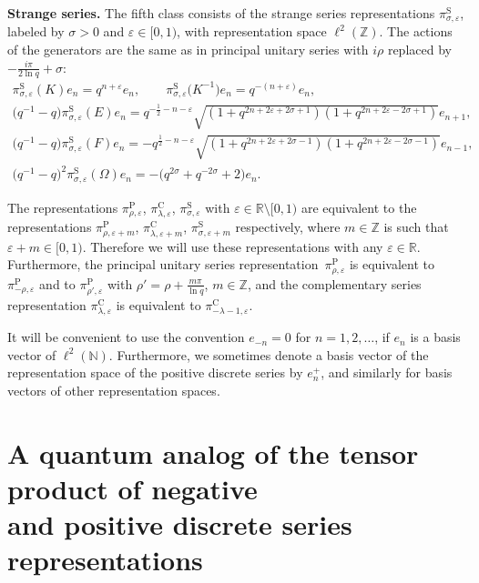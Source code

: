 \documentclass[11pt]{article}
\numberwithin{equation}{section}
\numberwithin{theorem}{section}
\numberwithin{proposition}{section}
\numberwithin{lemma}{section}
\numberwithin{corollary}{section}
\numberwithin{definition}{section}
\numberwithin{example}{section}
\numberwithin{remark}{section}
\numberwithin{note}{section}
\newcommand{\R}{\mathbb R}
\newcommand{\N}{\mathbb N}
\newcommand{\Z}{\mathbb Z}
\newcommand{\eps}{\varepsilon}
\begin{document}
\textbf{Strange series.} The f\/ifth class consists of the strange series representations $\pi^{\mathrm S}_{\sigma,\eps}$, labeled by $\sigma>0$ and $\eps \in [0,1)$, with representation space $\ell^2(\Z)$. The actions of the generators are the same as in principal unitary series with $i\rho$ replaced by $- \frac{ i\pi}{2\ln q}+\sigma$:
\begin{gather}
\pi^{\mathrm S}_{\sigma,\eps}(K) e_n = q^{n+\eps} e_n, \qquad
\pi^{\mathrm S}_{\sigma,\eps} \big(K^{-1}\big) e_n = q^{-(n+\eps)} e_n,\nonumber\\
\big(q^{-1}-q\big)\pi^{\mathrm S}_{\sigma,\eps}(E) e_n
= q^{-\frac12-n-\eps} \sqrt{(1+q^{2n+2\eps+2\sigma+1})
(1+q^{2n+2\eps-2\sigma+1})} e_{n+1},\nonumber\\
\big(q^{-1}-q\big)\pi^{\mathrm S}_{\sigma,\eps}(F) e_n = -q^{\frac12-n-\eps}
\sqrt{(1+q^{2n+2\eps+2\sigma-1}) (1+q^{2n+2\eps-2\sigma-1})} e_{n-1},\nonumber\\
\big(q^{-1}-q\big)^2 \pi^{\mathrm S}_{\sigma,\eps} (\Omega) e_n =-\big(q^{2\sigma}+q^{-2\sigma} +2\big)e_n.\label{eq:strange}
\end{gather}

The representations $\pi^{\mathrm P}_{\rho,\eps}$, $\pi^{\mathrm C}_{\lambda,\eps}$, $\pi^{\mathrm S}_{\sigma,\eps}$ with $\eps \in \R\setminus [0,1)$ are equivalent to the representations $\pi^{\mathrm P}_{\rho,\eps+m}$,  $\pi^{\mathrm C}_{\lambda,\eps+m}$, $\pi^{\mathrm S}_{\sigma,\eps+m}$ respectively, where $m \in \Z$ is such that $\eps+m \in [0,1)$. Therefore we will use these representations with any $\eps \in \R$. Furthermore, the principal unitary series representation~$\pi_{\rho,\eps}^{\mathrm P}$ is equivalent to $\pi_{-\rho,\eps}^{\mathrm P}$ and to $\pi_{\rho',\eps}^{\mathrm P}$ with $\rho'=\rho+\frac{m\pi}{\ln q}$, $m \in \Z$, and the complementary series representation $\pi_{\lambda,\eps}^{\mathrm{C}}$ is equivalent to $\pi_{-\lambda-1,\eps}^{\mathrm{C}}$.

It will be convenient to use the convention $e_{-n}=0$ for $n=1,2,\ldots$, if $e_n$ is a basis vector of $\ell^2(\N)$. Furthermore, we sometimes denote a basis vector of the representation space of the positive discrete series by $e_n^+$, and similarly for basis vectors of other representation spaces.


\section{A quantum analog of the tensor product of negative\\ and positive discrete series representations} \label{sec:-+}
\end{document}
